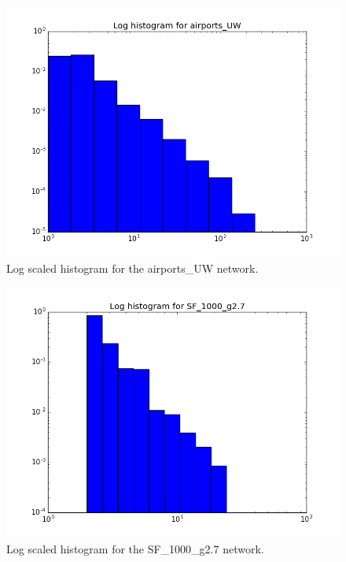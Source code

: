 \documentclass[12pt,a4paper,oneside]{article}
\numberwithin{equation}{section}
\numberwithin{equation}{section}
\theoremstyle{definition}
\begin{document}
\begin{figure}[h!]
	\centering
	\includegraphics[scale=0.5]{images/log_airports_UW.png}
	\caption{Log scaled histogram for the airports\_UW network.}
	\label{airport}
\end{figure}

\begin{figure}[h!]
	\centering
	\includegraphics[scale=0.5]{images/log_SF_1000_g2.png}
	\caption{Log scaled histogram for the SF\_1000\_g2.7 network.}
	\label{airport}
\end{figure}
\end{document}
